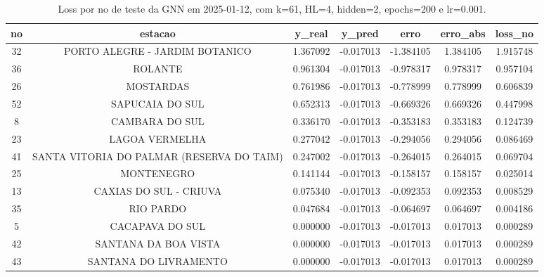 \begin{table}[h]
\centering
\caption{Loss por no de teste da GNN em 2025-01-12, com k=61, HL=4, hidden=2, epochs=200 e lr=0.001.}
\label{tab:gnn_loss_k61_hl4_h2_e200_d20250112}
\begin{tabular}{ccccccc}
\toprule
no & estacao & y\_real & y\_pred & erro & erro\_abs & loss\_no \\
\midrule
32 & PORTO ALEGRE - JARDIM BOTANICO & 1.367092 & -0.017013 & -1.384105 & 1.384105 & 1.915748 \\
36 & ROLANTE & 0.961304 & -0.017013 & -0.978317 & 0.978317 & 0.957104 \\
26 & MOSTARDAS & 0.761986 & -0.017013 & -0.778999 & 0.778999 & 0.606839 \\
52 & SAPUCAIA DO SUL & 0.652313 & -0.017013 & -0.669326 & 0.669326 & 0.447998 \\
8 & CAMBARA DO SUL & 0.336170 & -0.017013 & -0.353183 & 0.353183 & 0.124739 \\
23 & LAGOA VERMELHA & 0.277042 & -0.017013 & -0.294056 & 0.294056 & 0.086469 \\
41 & SANTA VITORIA DO PALMAR (RESERVA DO TAIM) & 0.247002 & -0.017013 & -0.264015 & 0.264015 & 0.069704 \\
25 & MONTENEGRO & 0.141144 & -0.017013 & -0.158157 & 0.158157 & 0.025014 \\
13 & CAXIAS DO SUL - CRIUVA & 0.075340 & -0.017013 & -0.092353 & 0.092353 & 0.008529 \\
35 & RIO PARDO & 0.047684 & -0.017013 & -0.064697 & 0.064697 & 0.004186 \\
5 & CACAPAVA DO SUL & 0.000000 & -0.017013 & -0.017013 & 0.017013 & 0.000289 \\
42 & SANTANA DA BOA VISTA & 0.000000 & -0.017013 & -0.017013 & 0.017013 & 0.000289 \\
43 & SANTANA DO LIVRAMENTO & 0.000000 & -0.017013 & -0.017013 & 0.017013 & 0.000289 \\
\bottomrule
\end{tabular}
\end{table}
